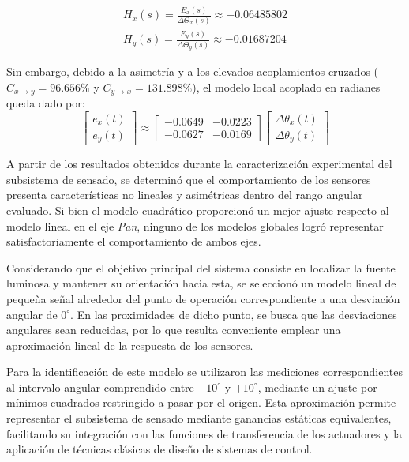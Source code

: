 \documentclass[12pt,a4paper]{article}
\begin{document}
\begin{align}
\boxed{H_x(s) = \frac{E_x(s)}{\Delta\Theta_x(s)} \approx -0.06485802} \\
\boxed{H_y(s) = \frac{E_y(s)}{\Delta\Theta_y(s)} \approx -0.01687204}
\end{align}

Sin embargo, debido a la asimetría y a los elevados acoplamientos cruzados ($C_{x\rightarrow y} = 96.656\%$ y $C_{y\rightarrow x} = 131.898\%$), el modelo local acoplado en radianes queda dado por:
\begin{equation}
\begin{bmatrix} e_x(t) \\ e_y(t) \end{bmatrix} \approx
\begin{bmatrix} -0.0649 & -0.0223 \\ -0.0627 & -0.0169 \end{bmatrix}
\begin{bmatrix} \Delta\theta_x(t) \\ \Delta\theta_y(t) \end{bmatrix}
\end{equation}

A partir de los resultados obtenidos durante la caracterización experimental del subsistema de sensado, se determinó que el comportamiento de los sensores presenta características no lineales y asimétricas dentro del rango angular evaluado. Si bien el modelo cuadrático proporcionó un mejor ajuste respecto al modelo lineal en el eje \emph{Pan}, ninguno de los modelos globales logró representar satisfactoriamente el comportamiento de ambos ejes.

Considerando que el objetivo principal del sistema consiste en localizar la fuente luminosa y mantener su orientación hacia esta, se seleccionó un modelo lineal de pequeña señal alrededor del punto de operación correspondiente a una desviación angular de $0^\circ$. En las proximidades de dicho punto, se busca que las desviaciones angulares sean reducidas, por lo que resulta conveniente emplear una aproximación lineal de la respuesta de los sensores.

Para la identificación de este modelo se utilizaron las mediciones correspondientes al intervalo angular comprendido entre $-10^\circ$ y $+10^\circ$, mediante un ajuste por mínimos cuadrados restringido a pasar por el origen. Esta aproximación permite representar el subsistema de sensado mediante ganancias estáticas equivalentes, facilitando su integración con las funciones de transferencia de los actuadores y la aplicación de técnicas clásicas de diseño de sistemas de control.
\end{document}
